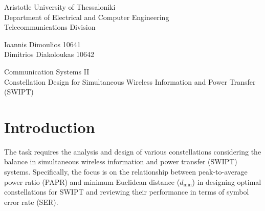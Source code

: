 \documentclass[11pt,a4paper,onecolumn,final]{article}
\newcommand{\en}[1]{\foreignlanguage{english}{#1}}
\begin{document}
\thispagestyle{empty}
{\sffamily\centering\Large

\vspace{\fill}

{\Large Aristotle University of Thessaloniki\\
Department of Electrical and Computer Engineering\\
Telecommunications Division}\\[0.5cm]


\vspace{2.0cm}

{\LARGE Ioannis Dimoulios 10641 \\
        Dimitrios Diakoloukas 10642}

\vspace{3.5cm}


{\LARGE Communication Systems II}\\[1em]

{\Large Constellation Design for Simultaneous  Wireless Information and Power Transfer (SWIPT)}

\vspace{3.5cm}


%
}

\newpage



\newpage



\section{Introduction}
The task requires the analysis and design of various constellations considering the
balance in simultaneous wireless information and power transfer (SWIPT) systems.
Specifically, the focus is on the relationship between peak-to-average power ratio (PAPR)
and minimum Euclidean distance ($d_{\text{min}}$) in designing optimal constellations for SWIPT and reviewing their performance in terms of symbol error rate (SER).
\end{document}

